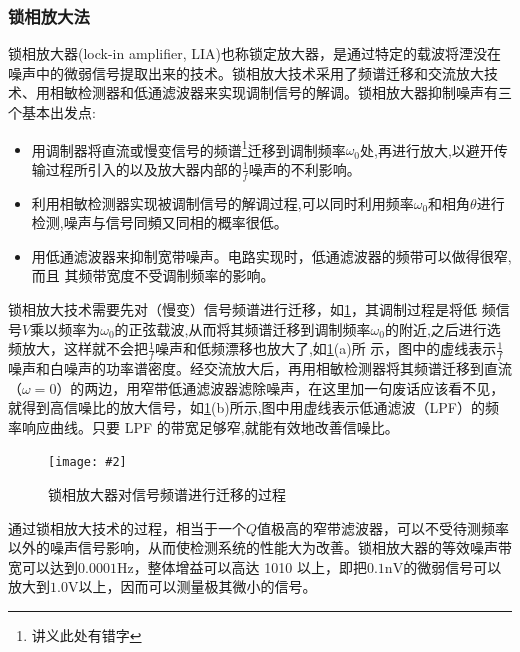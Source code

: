 \documentclass[11pt,a4paper]{ctexart}
\newcommand{\cpic}[2]{
\begin{center}
\texttt{[image: \#2]}
\end{center}
}
\newcommand{\cpicn}[3]
{
\begin{figure}[H]
\cpic{#1}{#2}
\caption{#3\label{#2}}
\end{figure}
}
\begin{document}
\subsubsection{锁相放大法}
\par
锁相放大器(lock-in amplifier, LIA)也称锁定放大器，是通过特定的载波将湮没在噪声中的微弱信号提取出来的技术。锁相放大技术采用了频谱迁移和交流放大技术、用相敏检测器和低通滤波器来实现调制信号的解调。锁相放大器抑制噪声有三个基本出发点:
\begin{itemize}
\item 用调制器将直流或慢变信号的频谱\footnote{讲义此处有错字}迁移到调制频率$\omega_0$处,再进行放大,以避开传输过程所引入的以及放大器内部的$\frac{1}{f}$噪声的不利影响。
\item 利用相敏检测器实现被调制信号的解调过程,可以同时利用频率$\omega_0$和相角$\theta$进行检测,噪声与信号同頻又同相的概率很低。
\item 用低通滤波器来抑制宽带噪声。电路实现时，低通滤波器的频带可以做得很窄,而且 其频带宽度不受调制频率的影响。
\end{itemize}
锁相放大技术需要先对（慢变）信号频谱进行迁移，如\cref{d17}，其调制过程是将低 频信号$V$乘以频率为$\omega_0$的正弦载波,从而将其频谱迁移到调制频率$\omega_0$的附近,之后进行选频放大，这样就不会把$\frac{1}{f}$噪声和低频漂移也放大了,如\cref{d17}(a)所 示，图中的虚线表示$\frac{1}{f}$噪声和白噪声的功率谱密度。经交流放大后，再用相敏检测器将其频谱迁移到直流（$\omega = 0$）的两边，用窄带低通滤波器滤除噪声，在这里加一句废话应该看不见，就得到高信噪比的放大信号，如\cref{d17}(b)所示,图中用虚线表示低通滤波（LPF）的频率响应曲线。只要 LPF 的带宽足够窄,就能有效地改善信噪比。
\cpicn{0.6}{d17}{锁相放大器对信号频谱进行迁移的过程}
通过锁相放大技术的过程，相当于一个$Q$值极高的窄带滤波器，可以不受待测频率以外的噪声信号影响，从而使检测系统的性能大为改善。锁相放大器的等效噪声带宽可以达到$0.0001\mathrm{Hz}$，整体增益可以高达 1010 以上，即把$0.1\mathrm{nV}$的微弱信号可以放大到$1.0\mathrm{V}$以上，因而可以测量极其微小的信号。
\end{document}

